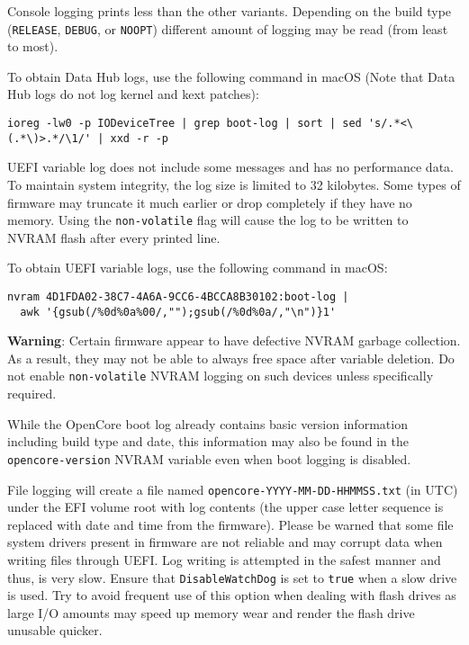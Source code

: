 \documentclass[]{article}
\begin{document}
\begin{enumerate}
  Console logging prints less than the other variants.
  Depending on the build type (\texttt{RELEASE}, \texttt{DEBUG}, or
  \texttt{NOOPT}) different amount of logging may be read (from least to most).

  To obtain Data Hub logs, use the following command in macOS
  (Note that Data Hub logs do not log kernel and kext patches):
\begin{lstlisting}[label=dhublog, style=ocbash]
ioreg -lw0 -p IODeviceTree | grep boot-log | sort | sed 's/.*<\(.*\)>.*/\1/' | xxd -r -p
\end{lstlisting}

  UEFI variable log does not include some messages and has no performance data. To maintain system
  integrity, the log size is limited to 32 kilobytes. Some types of firmware may truncate it much
  earlier or drop completely if they have no memory. Using the \texttt{non-volatile} flag will cause
  the log to be written to NVRAM flash after every printed line.

  To obtain UEFI variable logs, use the following command in macOS:
\begin{lstlisting}[label=nvramlog, style=ocbash]
nvram 4D1FDA02-38C7-4A6A-9CC6-4BCCA8B30102:boot-log |
  awk '{gsub(/%0d%0a%00/,"");gsub(/%0d%0a/,"\n")}1'
\end{lstlisting}

  \textbf{Warning}: Certain firmware appear to have defective NVRAM garbage collection.
  As a result, they may not be able to always free space after variable deletion. Do not
  enable \texttt{non-volatile} NVRAM logging on such devices unless specifically required.

  While the OpenCore boot log already contains basic version information including build type
  and date, this information may also be found in the \texttt{opencore-version} NVRAM variable
  even when boot logging is disabled.

  File logging will create a file named \texttt{opencore-YYYY-MM-DD-HHMMSS.txt} (in UTC) under
  the EFI volume root with log contents (the upper case letter sequence is replaced with date
  and time from the firmware). Please be warned that some file system drivers present in
  firmware are not reliable and may corrupt data when writing files through UEFI. Log
  writing is attempted in the safest manner and thus, is very slow. Ensure that
  \texttt{DisableWatchDog} is set to \texttt{true} when a slow drive is used. Try to
  avoid frequent use of this option when dealing with flash drives as large I/O
  amounts may speed up memory wear and render the flash drive unusable quicker.


\end{enumerate}
\end{document}
